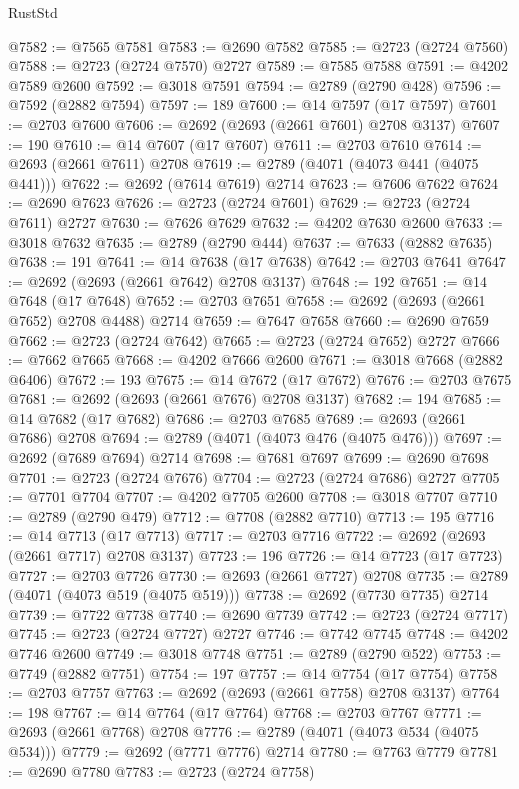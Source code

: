 \begin{lexlean}{RustStd}
\begin{coremodule}
{\begin{coremodule}
{{{{{{{{{{{{{{{{{{{{{{{{{{{{{{{{{{{{{{{@7582 := @7565 @7581
@7583 := @2690 @7582
@7585 := @2723 (@2724 @7560)
@7588 := @2723 (@2724 @7570) @2727
@7589 := @7585 @7588
@7591 := @4202 @7589 @2600
@7592 := @3018 @7591
@7594 := @2789 (@2790 @428)
@7596 := @7592 (@2882 @7594)
@7597 := 189
@7600 := @14 @7597 (@17 @7597)
@7601 := @2703 @7600
@7606 := @2692 (@2693 (@2661 @7601) @2708 @3137)
@7607 := 190
@7610 := @14 @7607 (@17 @7607)
@7611 := @2703 @7610
@7614 := @2693 (@2661 @7611) @2708
@7619 := @2789 (@4071 (@4073 @441 (@4075 @441)))
@7622 := @2692 (@7614 @7619) @2714
@7623 := @7606 @7622
@7624 := @2690 @7623
@7626 := @2723 (@2724 @7601)
@7629 := @2723 (@2724 @7611) @2727
@7630 := @7626 @7629
@7632 := @4202 @7630 @2600
@7633 := @3018 @7632
@7635 := @2789 (@2790 @444)
@7637 := @7633 (@2882 @7635)
@7638 := 191
@7641 := @14 @7638 (@17 @7638)
@7642 := @2703 @7641
@7647 := @2692 (@2693 (@2661 @7642) @2708 @3137)
@7648 := 192
@7651 := @14 @7648 (@17 @7648)
@7652 := @2703 @7651
@7658 := @2692 (@2693 (@2661 @7652) @2708 @4488) @2714
@7659 := @7647 @7658
@7660 := @2690 @7659
@7662 := @2723 (@2724 @7642)
@7665 := @2723 (@2724 @7652) @2727
@7666 := @7662 @7665
@7668 := @4202 @7666 @2600
@7671 := @3018 @7668 (@2882 @6406)
@7672 := 193
@7675 := @14 @7672 (@17 @7672)
@7676 := @2703 @7675
@7681 := @2692 (@2693 (@2661 @7676) @2708 @3137)
@7682 := 194
@7685 := @14 @7682 (@17 @7682)
@7686 := @2703 @7685
@7689 := @2693 (@2661 @7686) @2708
@7694 := @2789 (@4071 (@4073 @476 (@4075 @476)))
@7697 := @2692 (@7689 @7694) @2714
@7698 := @7681 @7697
@7699 := @2690 @7698
@7701 := @2723 (@2724 @7676)
@7704 := @2723 (@2724 @7686) @2727
@7705 := @7701 @7704
@7707 := @4202 @7705 @2600
@7708 := @3018 @7707
@7710 := @2789 (@2790 @479)
@7712 := @7708 (@2882 @7710)
@7713 := 195
@7716 := @14 @7713 (@17 @7713)
@7717 := @2703 @7716
@7722 := @2692 (@2693 (@2661 @7717) @2708 @3137)
@7723 := 196
@7726 := @14 @7723 (@17 @7723)
@7727 := @2703 @7726
@7730 := @2693 (@2661 @7727) @2708
@7735 := @2789 (@4071 (@4073 @519 (@4075 @519)))
@7738 := @2692 (@7730 @7735) @2714
@7739 := @7722 @7738
@7740 := @2690 @7739
@7742 := @2723 (@2724 @7717)
@7745 := @2723 (@2724 @7727) @2727
@7746 := @7742 @7745
@7748 := @4202 @7746 @2600
@7749 := @3018 @7748
@7751 := @2789 (@2790 @522)
@7753 := @7749 (@2882 @7751)
@7754 := 197
@7757 := @14 @7754 (@17 @7754)
@7758 := @2703 @7757
@7763 := @2692 (@2693 (@2661 @7758) @2708 @3137)
@7764 := 198
@7767 := @14 @7764 (@17 @7764)
@7768 := @2703 @7767
@7771 := @2693 (@2661 @7768) @2708
@7776 := @2789 (@4071 (@4073 @534 (@4075 @534)))
@7779 := @2692 (@7771 @7776) @2714
@7780 := @7763 @7779
@7781 := @2690 @7780
@7783 := @2723 (@2724 @7758)
}}}}}}}}}}}}}}}}}}}}}}}}}}}}}}}}}}}}}}}
\end{coremodule}}
\end{coremodule}
\end{lexlean}
